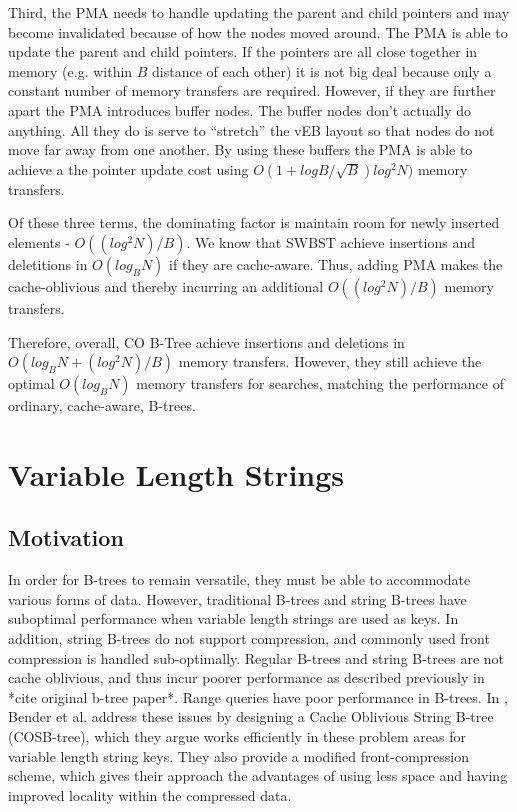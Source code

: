 \documentclass{style}
\begin{document}
Third, the PMA needs to handle updating the parent and child pointers and may
become invalidated because of how the nodes moved around. The PMA is able to
update the parent and child pointers. If the pointers are all close together
in memory (e.g. within $B$ distance of each other) it is not big deal because
only a constant number of memory transfers are required. However, if they are
further apart the PMA introduces buffer nodes. The buffer nodes don't actually
do anything. All they do is serve to ``stretch'' the vEB layout so that nodes
do not move far away from one another. By using these buffers the PMA is able
to achieve a the pointer update cost using $O(1+ logB / \sqrt{B}) log^2 N)$
memory transfers.

Of these three terms, the dominating factor is maintain room for newly
inserted elements - $O((log^2N)/B)$. We know that SWBST achieve insertions and
deletitions in $O(log_B N)$ if they are cache-aware. Thus, adding PMA makes
the cache-oblivious and thereby incurring an additional $O((log^2N)/B)$ memory
transfers.

Therefore, overall, CO B-Tree achieve insertions and deletions in $O(log_B N +
(log^2N)/B)$ memory transfers. However, they still achieve the optimal
$O(log_B N)$ memory transfers for searches, matching the performance of
ordinary, cache-aware, B-trees.

\section{Variable Length Strings}

\subsection{Motivation}
In order for B-trees to remain versatile, they must be able to accommodate various forms of data. However, traditional B-trees and string B-trees have suboptimal performance when variable length strings are used as keys. In addition, string B-trees do not support compression, and commonly used front compression is handled sub-optimally. Regular B-trees and string B-trees are not cache oblivious, and thus incur poorer performance as described previously in *cite original b-tree paper*. Range queries have poor performance in B-trees. In \cite{BenderFaKu06}, Bender et al. address these issues by designing a Cache Oblivious String B-tree (COSB-tree), which they argue works efficiently in these problem areas for variable length string keys. They also provide a modified front-compression scheme, which gives their approach the advantages of using less space and having improved locality within the compressed data.
\end{document}
